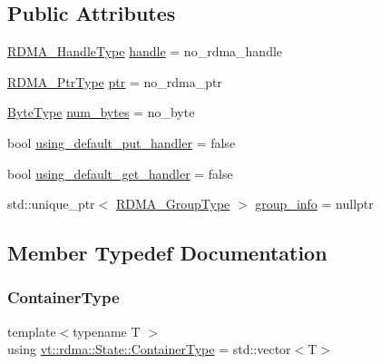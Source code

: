 \subsection*{Public Attributes}
\begin{DoxyCompactItemize}
\item 
\hyperlink{namespacevt_a10442579ec4e7ebef223818e64bcf908}{R\+D\+M\+A\+\_\+\+Handle\+Type} \hyperlink{structvt_1_1rdma_1_1_state_ac6ea5c9dffcc795713d1766b1c3e7028}{handle} = no\+\_\+rdma\+\_\+handle
\item 
\hyperlink{namespacevt_a9e2c953286c7616f7c218e9951790776}{R\+D\+M\+A\+\_\+\+Ptr\+Type} \hyperlink{structvt_1_1rdma_1_1_state_a60bb2c1f277de56d89e741f87e944c93}{ptr} = no\+\_\+rdma\+\_\+ptr
\item 
\hyperlink{namespacevt_aab8d55968084610ce3b17057981e9300}{Byte\+Type} \hyperlink{structvt_1_1rdma_1_1_state_a0c249d4fe06c8ec521ac6f68b064e8a2}{num\+\_\+bytes} = no\+\_\+byte
\item 
bool \hyperlink{structvt_1_1rdma_1_1_state_ad3d72847190c02761393d124cb07a917}{using\+\_\+default\+\_\+put\+\_\+handler} = false
\item 
bool \hyperlink{structvt_1_1rdma_1_1_state_ab8fc994adb5e3a106657fff53efd34a8}{using\+\_\+default\+\_\+get\+\_\+handler} = false
\item 
std\+::unique\+\_\+ptr$<$ \hyperlink{structvt_1_1rdma_1_1_state_aec26643b760f80a59e0c07c580e99ebc}{R\+D\+M\+A\+\_\+\+Group\+Type} $>$ \hyperlink{structvt_1_1rdma_1_1_state_ad8dc4c1a674c5a0b14789a53e54815d3}{group\+\_\+info} = nullptr
\end{DoxyCompactItemize}


\subsection{Member Typedef Documentation}
\mbox{\label{structvt_1_1rdma_1_1_state_a7506401f1846be85f14e73e75b773a5d}} 
\subsubsection{\texorpdfstring{Container\+Type}{ContainerType}}
{\footnotesize\ttfamily template$<$typename T $>$ \\
using \hyperlink{structvt_1_1rdma_1_1_state_a7506401f1846be85f14e73e75b773a5d}{vt\+::rdma\+::\+State\+::\+Container\+Type} =  std\+::vector$<$T$>$}

